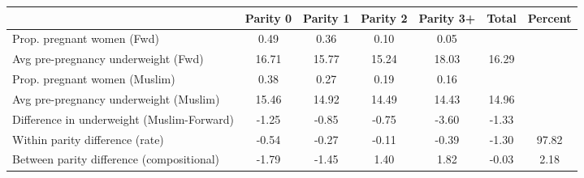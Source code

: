 \begin{tabular}{l*{6}{c}}
\toprule
            &\multicolumn{1}{c}{Parity 0}&\multicolumn{1}{c}{Parity 1}&\multicolumn{1}{c}{Parity 2}&\multicolumn{1}{c}{Parity 3+}&\multicolumn{1}{c}{Total}&\multicolumn{1}{c}{Percent}\\
\midrule
\midrule
Prop. pregnant women (Fwd)&        0.49&        0.36&        0.10&        0.05&            &            \\
Avg pre-pregnancy underweight (Fwd)&       16.71&       15.77&       15.24&       18.03&       16.29&            \\
Prop. pregnant women (Muslim)&        0.38&        0.27&        0.19&        0.16&            &            \\
Avg pre-pregnancy underweight (Muslim)&       15.46&       14.92&       14.49&       14.43&       14.96&            \\
Difference in underweight (Muslim-Forward)&       -1.25&       -0.85&       -0.75&       -3.60&       -1.33&            \\
Within parity difference (rate)&       -0.54&       -0.27&       -0.11&       -0.39&       -1.30&       97.82\\
Between parity difference (compositional)&       -1.79&       -1.45&        1.40&        1.82&       -0.03&        2.18\\
\bottomrule
\end{tabular}
